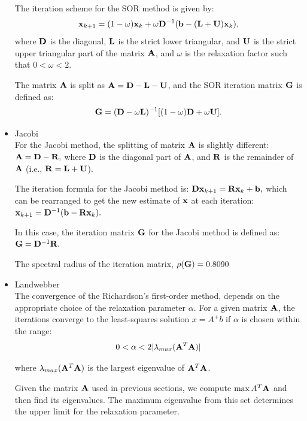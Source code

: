 \begin{itemize}
    The iteration scheme for the SOR method is given by:
    $$ \mathbf{x}_{k+1} = (1-\omega)\mathbf{x}_k + \omega \mathbf{D}^{-1}(\mathbf{b} - (\mathbf{L} + \mathbf{U})\mathbf{x}_k), $$
    where $ \mathbf{D} $ is the diagonal, $ \mathbf{L} $ is the strict lower triangular, and $ \mathbf{U} $ is the strict upper triangular part of the matrix $ \mathbf{A} $, and $ \omega $ is the relaxation factor such that $ 0 < \omega < 2 $.

    The matrix $ \mathbf{A} $ is split as $ \mathbf{A} = \mathbf{D} - \mathbf{L} - \mathbf{U} $, and the SOR iteration matrix $ \mathbf{G}$ is defined as:
    $$ \mathbf{G}  = (\mathbf{D} - \omega \mathbf{L})^{-1}[(1-\omega)\mathbf{D} + \omega \mathbf{U}]. $$

  \item Jacobi \\
  
    For the Jacobi method, the splitting of matrix $ \mathbf{A} $ is slightly different:
    $ \mathbf{A} = \mathbf{D} - \mathbf{R}, $
    where $ \mathbf{D} $ is the diagonal part of $ \mathbf{A} $, and $ \mathbf{R} $ is the remainder of $ \mathbf{A} $ (i.e., $ \mathbf{R} = \mathbf{L} + \mathbf{U} $).

    The iteration formula for the Jacobi method is:
    $ \mathbf{Dx}_{k+1} = \mathbf{Rx}_k + \mathbf{b}, $
    which can be rearranged to get the new estimate of $ \mathbf{x} $ at each iteration:
    $ \mathbf{x}_{k+1} = \mathbf{D}^{-1}(\mathbf{b} - \mathbf{Rx}_k). $

    In this case, the iteration matrix $ \mathbf{G} $ for the Jacobi method is defined as:
    $ \mathbf{G} = \mathbf{D}^{-1}\mathbf{R}. $

    The spectral radius of the iteration matrix, $ \rho(\mathbf{G}) = 0.8090$

  \item Landwebber \\
  
  The convergence of the Richardson's first-order method, depends on the appropriate choice of the relaxation parameter \( \alpha \). 
  For a given matrix $\mathbf{A}$, the iterations converge to the least-squares solution \( x = A^+b \) if \( \alpha \) is chosen within the range:
  \begin{equation*}
    0 < \alpha < 2|\lambda_{max}(\mathbf{A}^T\mathbf{A})| 
  \end{equation*}

  where  $\lambda_{max}(\mathbf{A}^T\mathbf{A})$ is the largest eigenvalue of $ \mathbf{A}^T\mathbf{A} $.

  Given the matrix $\mathbf{A}$ used in previous sections, we compute $\max{A}^T\mathbf{A}$ and then find its eigenvalues. 
  The maximum eigenvalue from this set determines the upper limit for the relaxation parameter. 
  

\end{itemize}
